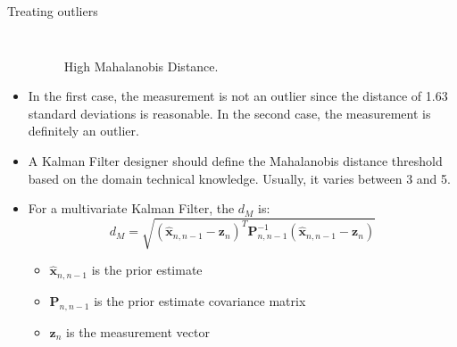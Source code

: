 \begin{frame}{Treating outliers}
\begin{columns}
\begin{itemize}
\begin{figure}[!t]
            \vspace{-10pt}
            \caption{High Mahalanobis Distance.}
            \vspace{-5pt}
        \end{figure}
        \item In the first case, the measurement is not an outlier since the distance of 1.63 standard deviations is reasonable. In the second case, the measurement is definitely an outlier.

        
        \item A Kalman Filter designer should define the Mahalanobis distance threshold based on the domain technical knowledge. Usually, it varies between 3 and 5.
        
        \item For a multivariate Kalman Filter, the $d_M$ is:
        \[
        d_M = \sqrt{(\hat{\bm{x}}_{n,n-1} - \bm{z}_n)^T \bm{P}_{n,n-1}^{-1} (\hat{\bm{x}}_{n,n-1} - \bm{z}_n)}
        \]
        \vspace{-10pt}
        \begin{itemize}
            \item \( \hat{\bm{x}}_{n,n-1} \) is the prior estimate
            \item \( \bm{P}_{n,n-1} \) is the prior estimate covariance matrix
            \item \( \bm{z}_n \) is the measurement vector
        \end{itemize}
    \end{itemize}
\end{columns}
\end{frame}



